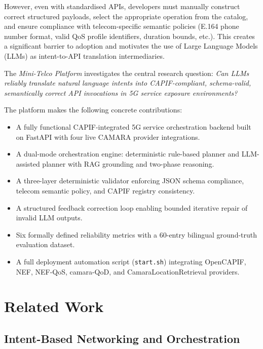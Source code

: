 \documentclass[conference]{IEEEtran}
\begin{document}
However, even with standardised APIs, developers must manually construct
correct structured payloads, select the appropriate operation from the catalog,
and ensure compliance with telecom-specific semantic policies (E.164 phone
number format, valid QoS profile identifiers, duration bounds, etc.). This
creates a significant barrier to adoption and motivates the use of Large
Language Models (LLMs) as intent-to-API translation intermediaries.

The \textit{Mini-Telco Platform} investigates the central research question:
\emph{Can LLMs reliably translate natural language intents into
CAPIF-compliant, schema-valid, semantically correct API invocations in 5G
service exposure environments?}

The platform makes the following concrete contributions:

\begin{itemize}[leftmargin=1.2em]
  \item A fully functional CAPIF-integrated 5G service orchestration backend
        built on FastAPI with four live CAMARA provider integrations.
  \item A dual-mode orchestration engine: deterministic rule-based planner
        and LLM-assisted planner with RAG grounding and two-phase
        reasoning.
  \item A three-layer deterministic validator enforcing JSON schema
        compliance, telecom semantic policy, and CAPIF registry consistency.
  \item A structured feedback correction loop enabling bounded iterative
        repair of invalid LLM outputs.
  \item Six formally defined reliability metrics with a 60-entry bilingual
        ground-truth evaluation dataset.
  \item A full deployment automation script (\texttt{start.sh}) integrating
        OpenCAPIF, NEF, NEF-QoS, camara-QoD, and CamaraLocationRetrieval
        providers.
\end{itemize}

\section{Related Work}
\label{sec:related}

\subsection{Intent-Based Networking and Orchestration}
\end{document}
